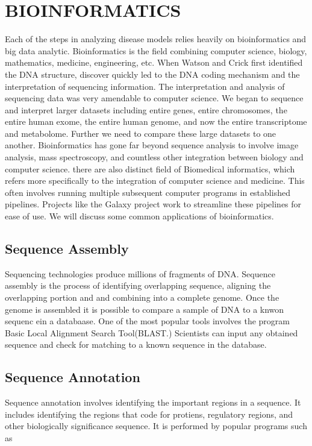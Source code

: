 \documentclass[sigconf]{acmart}
\begin{document}
\section{BIOINFORMATICS} 
Each of the steps in analyzing disease models relies heavily on bioinformatics and big data analytic.  Bioinformatics is the field combining computer science, biology, mathematics, medicine, engineering, etc. \cite{saeys2007review} When Watson and Crick first identified the DNA structure, discover quickly led to the DNA coding mechanism and the interpretation of sequencing information.  The interpretation and analysis of sequencing data  was very amendable to computer science.  We began to sequence and interpret larger datasets including entire genes, entire chromosomes, the entire human exome, the entire human genome, and now the entire transcriptome and metabolome.  Further we need to compare these large datasets to one another.  Bioinformatics has gone far beyond sequence analysis to involve image analysis, mass spectroscopy, and countless other integration between biology and computer science.  there are also distinct field of Biomedical informatics, which refers more specifically to the integration of computer science and medicine. This often involves running multiple subsequent computer programs in established pipelines.  Projects like the Galaxy project work to streamline these pipelines for ease of use.  We will discuss some common applications of bioinformatics.     

\subsection{Sequence Assembly}  
Sequencing technologies produce millions of fragments of DNA.  Sequence assembly is the process of identifying overlapping sequence, aligning the overlapping portion and and combining into a complete genome. Once the genome is assembled it is possible to compare a sample of DNA to a knwon sequenc ein a databaase.  One of the most popular tools involves the program Basic Local Alignment Search Tool(BLAST.)  Scientists can input any obtained sequence and check for matching to a known sequence in the database.        

\subsection{Sequence Annotation}  
Sequence annotation involves identifying the important regions in a sequence.  It includes identifying the regions that code for protiens, regulatory regions, and other biologically significance sequence. It is performed by popular programs such as   
\end{document}

